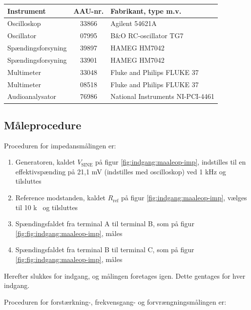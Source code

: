 \begin{table}[h]
\centering
\begin{tabular}{l|c|l}
\hline\hline
Instrument & AAU-nr. & Fabrikant, type m.v. \\
\hline\hline
Oscilloskop & 33866 & Agilent 54621A \\[4pt]
Oscillator & 07995 & B\&O RC-oscillator TG7 \\[4pt]
Spændingsforsyning & 39897 & HAMEG HM7042 \\[4pt]
Spændingsforsyning & 33901 & HAMEG HM7042 \\[4pt]
Multimeter & 33048 & Fluke and Philips FLUKE 37 \\[4pt]
Multimeter & 08518 & Fluke and Philips FLUKE 37 \\[4pt]
Audioanalysator & 76986 & National Instruments NI-PCI-4461 \\
\hline\hline
\end{tabular}
\label{tab:indgang:maaleudstyr_forforstaerker}
\end{table}

\subsection*{Måleprocedure}
\label{indgang:maalejournal_maaleprocedure}
Proceduren for impedansmålingen er:

\begin{enumerate}
\item Generatoren, kaldet $V_\mathrm{SINE}$ på figur \ref{fig:indgang:maaleop-imp}, indstilles til en effektivspænding på 21,1 mV (indstilles med oscilloskop) ved 1 kHz og tilsluttes
\item Reference modstanden, kaldet $R_\mathrm{ref}$ på figur \ref{fig:indgang:maaleop-imp}, vælges til 10 k\ohm~ og tilsluttes
\item Spændingsfaldet fra terminal A til terminal B, som på figur \ref{fig:fig:indgang:maaleop-imp}, måles
\item Spændingsfaldet fra terminal B til terminal C, som på figur \ref{fig:fig:indgang:maaleop-imp}, måles
\end{enumerate}
Herefter slukkes for indgang, og målingen foretages igen. Dette gentages for hver indgang.

Proceduren for forstærkning-, frekvensgang- og forvrængningsmålingen er:

